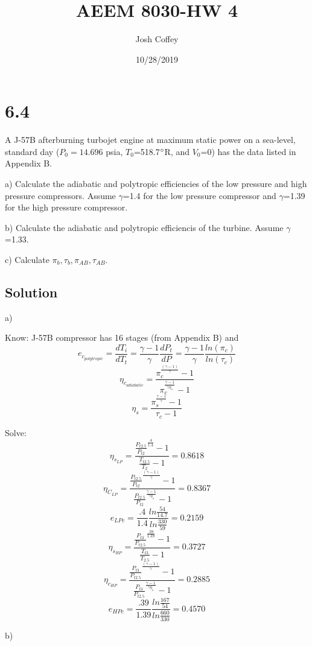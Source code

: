 \documentclass[preview,12pt]{article}
\begin{document}
\noindent

\title{AEEM 8030-HW 4}
\author{Josh Coffey}
\date{10/28/2019}
\maketitle

\section{6.4}
A J-57B afterburning turbojet engine at maximum static power on a sea-level, standard day ($P_0=14.696$ psia, $T_0$=518.7$\degree$R, and $V_0$=0) has the data listed in Appendix B.

a) Calculate the adiabatic and polytropic efficiencies of the low pressure and high pressure compressors.  Assume $\gamma$=1.4 for the low pressure compressor and $\gamma$=1.39 for the high pressure compressor.

b) Calculate the adiabatic and polytropic efficiencis of the turbine.  Assume $\gamma$=1.33.

c) Calculate $\pi_b, \tau_b, \pi_{AB}, \tau_{AB}$.

	\subsection{Solution}
	a)
	
	Know:
	J-57B compressor has 16 stages (from Appendix B) and 
	$$e_{c_{polytropic}}=\frac{dT_i}{dT_t}=\frac{\gamma-1}{\gamma}\frac{dP_t}{dP}=\frac{\gamma-1}{\gamma}\frac{ln(\pi_c)}{ln(\tau_c)}$$
	$$\eta_{c_{adiabatic}}=\frac{\pi_c^\frac{(\gamma-1)}{\gamma}-1}{\pi_c^\frac{\gamma-1}{\gamma\eta_s}-1}$$
	$$\eta_s=\frac{\pi_s^\frac{\gamma-1}{\gamma}-1}{\tau_c-1}$$
	
	Solve:
	$$\eta_{s_{LP}}=\frac{\frac{P_{t2.5}}{P_{t2}}^\frac{.4}{1.4}-1}{\frac{T_{t2.5}}{T_{2}}-1}=0.8618$$
	$$\eta_{C_{LP}}=\frac{\frac{P_{t2.5}}{P_{t2}}^\frac{(\gamma-1)}{\gamma}-1}{\frac{P_{t2.5}}{P_{t2}}^\frac{\gamma-1}{\gamma\eta_s}-1}=\boxed{0.8367}$$
	$$e_{LPc}=\frac{.4}{1.4}\frac{ln\frac{54}{14.7}}{ln{\frac{330}{59}}}=\boxed{0.2159}$$
	$$\eta_{s_{HP}}=\frac{\frac{P_{t3}}{P_{t2.5}}^\frac{.39}{1.39}-1}{\frac{T_{t3}}{T_{2.5}}-1}=0.3727$$
	$$\eta_{c_{HP}}=\frac{\frac{P_{t3}}{P_{t2.5}}^\frac{(\gamma-1)}{\gamma}-1}{\frac{P_{t3}}{P_{t2.5}}^\frac{\gamma-1}{\gamma\eta_s}-1}=\boxed{0.2885}$$
	$$e_{HPc}=\frac{.39}{1.39}\frac{ln\frac{167}{54}}{ln{\frac{660}{330}}}=\boxed{0.4570}$$
	
	
	b)
	
\end{document}
